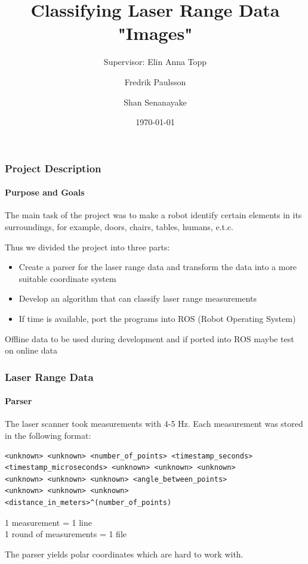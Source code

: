 \documentclass{beamer}
\title[Classifying Laser Range Data "Images"] %
{Classifying Laser Range Data "Images"}
\subtitle{Supervisor: Elin Anna Topp}
\author[F. Paulsson, S. Senanayake]%
{Fredrik Paulsson \and Shan Senanayake}
\institute[LTH] %
{Lund University \\ Faculty of Engineering}
\date[\today] %
{\today}
\begin{document}
\frame{\titlepage}

\begin{frame}
\frametitle{Project Description}
\framesubtitle{Purpose and Goals}

The main task of the project was to make a robot identify certain elements in its surroundings, for example, doors, chairs, tables, humans, e.t.c.

\vspace{10pt}

Thus we divided the project into three parts:

\begin{itemize}
\pause
\item{Create a parser for the laser range data and transform the data into a more suitable coordinate system}
\pause  
\item{Develop an algorithm that can classify laser range measurements}
\pause  
\item{If time is available, port the programs into ROS (Robot Operating System)}
\end{itemize}
\pause
Offline data to be used during development and if ported into ROS maybe test on online data

\end{frame}

\begin{frame}[fragile]
\frametitle{Laser Range Data}
\framesubtitle{Parser}

The laser scanner took measurements with 4-5 Hz. Each measurement was stored in the following format:
\begin{verbatim}
<unknown> <unknown> <number_of_points> <timestamp_seconds>
<timestamp_microseconds> <unknown> <unknown> <unknown>
<unknown> <unknown> <unknown> <angle_between_points>
<unknown> <unknown> <unknown>
<distance_in_meters>^(number_of_points)
\end{verbatim}

1 measurement = 1 line
\\
1 round of measurements = 1 file

\pause
\vspace{10pt}

The parser yields polar coordinates which are hard to work with.

\end{frame}
\end{document}
